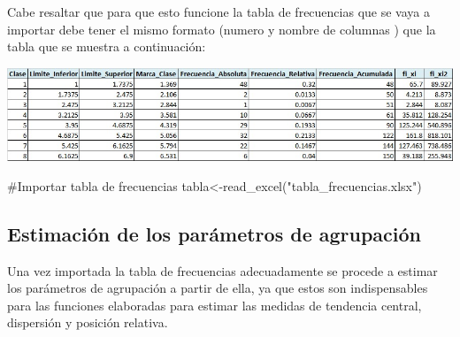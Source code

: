 \documentclass[
  spanish,
  letterpaper,
]{book}
\newenvironment{Shaded}{\begin{snugshade}}{\end{snugshade}}
\newcommand{\CommentTok}[1]{\textcolor[rgb]{0.37,0.37,0.37}{#1}}
\newcommand{\FunctionTok}[1]{\textcolor[rgb]{0.28,0.35,0.67}{#1}}
\newcommand{\NormalTok}[1]{\textcolor[rgb]{0.00,0.23,0.31}{#1}}
\newcommand{\OtherTok}[1]{\textcolor[rgb]{0.00,0.23,0.31}{#1}}
\newcommand{\StringTok}[1]{\textcolor[rgb]{0.13,0.47,0.30}{#1}}
\begin{document}
Cabe resaltar que para que esto funcione la tabla de frecuencias que se
vaya a importar debe tener el mismo formato (numero y nombre de columnas
) que la tabla que se muestra a continuación:

\begin{center}
\includegraphics[width=8.33333in,height=\textheight,keepaspectratio]{tabla_frecuencias.jpg}
\end{center}

\begin{Shaded}
\begin{Highlighting}[]
\CommentTok{\#Importar tabla de frecuencias}
\NormalTok{tabla}\OtherTok{\textless{}{-}}\FunctionTok{read\_excel}\NormalTok{(}\StringTok{"tabla\_frecuencias.xlsx"}\NormalTok{)}
\end{Highlighting}
\end{Shaded}

\subsection{Estimación de los parámetros de
agrupación}\label{estimaciuxf3n-de-los-paruxe1metros-de-agrupaciuxf3n}

Una vez importada la tabla de frecuencias adecuadamente se procede a
estimar los parámetros de agrupación a partir de ella, ya que estos son
indispensables para las funciones elaboradas para estimar las medidas de
tendencia central, dispersión y posición relativa.
\end{document}
